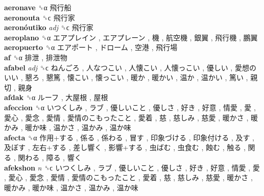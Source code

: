 \textbf{aeronave} ␝α   飛行船   \\
\textbf{aeronouta} ␝ϲ   飛行家   \\
\textbf{aeronóutiko} \emph{adj}  ␝ϲ   飛行家   \\
\textbf{aeroplano} ␝α   エアプレイン ,  エアプレーン ,  機 ,  航空機 ,  銀翼 ,  飛行機 ,  鵬翼   \\
\textbf{aeropuerto} ␝α   エアポート ,  ドローム ,  空港 ,  飛行場   \\
\textbf{af} ␝α   排泄 ,  排泄物   \\
\textbf{afabel} \emph{adj}  ␝ϲ   ねんごろ ,  人なつこい ,  人懐こい ,  人懐っこい ,  優しい ,  愛想のいい ,  懇ろ ,  懇篤 ,  懐こい ,  懐っこい ,  暖か ,  暖かい ,  温か ,  温かい ,  篤い ,  親切 ,  親身   \\
\textbf{afdak} ␝α   ルーフ ,  大屋根 ,  屋根   \\
\textbf{afeccion} ␝α   いつくしみ ,  ラブ ,  優しいこと ,  優しさ ,  好き ,  好意 ,  情愛 ,  愛 ,  愛心 ,  愛念 ,  愛情 ,  愛情のこもったこと ,  愛着 ,  慈 ,  慈しみ ,  慈愛 ,  暖かさ ,  暖かみ ,  暖か味 ,  温かさ ,  温かみ ,  温か味   \\
\textbf{afecta} ␝α   作用+する ,  係る ,  係わる ,  冒す ,  印象づける ,  印象付ける ,  及す ,  及ぼす ,  左右+する ,  差し響く ,  影響+する ,  虫ばむ ,  虫食む ,  蝕む ,  触る ,  関る ,  関わる ,  障る ,  響く   \\
\textbf{afekshon} \emph{n}  ␝ϲ   いつくしみ ,  ラブ ,  優しいこと ,  優しさ ,  好き ,  好意 ,  情愛 ,  愛 ,  愛心 ,  愛念 ,  愛情 ,  愛情のこもったこと ,  愛着 ,  慈 ,  慈しみ ,  慈愛 ,  暖かさ ,  暖かみ ,  暖か味 ,  温かさ ,  温かみ ,  温か味   \\
